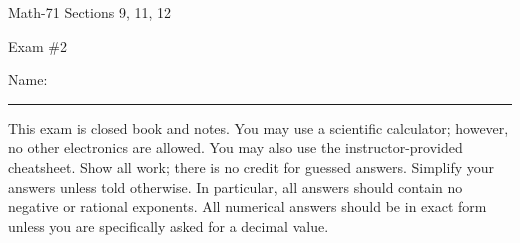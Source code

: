 \documentclass[letterpaper,12pt,fleqn]{article}
\begin{document}
\begin{center}
  \large
  Math-71 Sections 9, 11, 12

  \Large
  Exam \#2
\end{center}

\vspace{0.5in}

Name: \rule{4in}{1pt}

\vspace{0.5in}

This exam is closed book and notes. You may use a scientific calculator; however, no other electronics are allowed.  You may
also use the instructor-provided cheatsheet.  Show all work; there is no credit for guessed answers.  Simplify your answers
unless told otherwise.  In particular, all answers should contain no negative or rational exponents.  All numerical answers
should be in exact form unless you are specifically asked for a decimal value.  

\vspace{0.5in}
\end{document}
